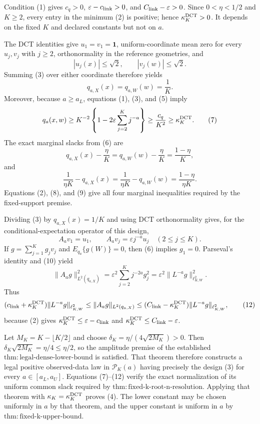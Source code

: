 Condition (1) gives \(c_q>0\), \(\varepsilon-c_{\rm link}>0\), and \(C_{\rm link}-\varepsilon>0\). Since \(0<\eta<1/2\) and \(K\ge2\), every entry in the minimum (2) is positive; hence \(\kappa_K^{\rm DCT}>0\). It depends on the fixed \(K\) and declared constants but not on \(a\).

The DCT identities give \(u_1=v_1=\mathbf1\), uniform-coordinate mean zero for every \(u_j,v_j\) with \(j\ge2\), orthonormality in the reference geometries, and
\[
|u_j(x)|\le\sqrt2,
\qquad
|v_j(w)|\le\sqrt2.
\tag{5}
\]
Summing (3) over either coordinate therefore yields
\[
q_{a,X}(x)=q_{a,W}(w)=\frac1K.
\tag{6}
\]
Moreover, because \(a\ge a_L\), equations (1), (3), and (5) imply
\[
q_a(x,w)
\ge K^{-2}\left\{1-2\varepsilon\sum_{j=2}^Kj^{-a}\right\}
\ge\frac{c_q}{K^2}
\ge\kappa_K^{\rm DCT}.
\tag{7}
\]
The exact marginal slacks from (6) are
\[
q_{a,X}(x)-\frac\eta K
=q_{a,W}(w)-\frac\eta K
=\frac{1-\eta}{K},
\tag{8}
\]
and
\[
\frac1{\eta K}-q_{a,X}(x)
=\frac1{\eta K}-q_{a,W}(w)
=\frac{1-\eta}{\eta K}.
\tag{9}
\]
Equations (2), (8), and (9) give all four marginal inequalities required by the fixed-support premise.

Dividing (3) by \(q_{a,X}(x)=1/K\) and using DCT orthonormality gives, for the conditional-expectation operator of this design,
\[
A_av_1=u_1,
\qquad
A_av_j=\varepsilon j^{-a}u_j
\quad(2\le j\le K).
\tag{10}
\]
If \(g=\sum_{j=1}^Kg_jv_j\) and \(E_{q_a}\{g(W)\}=0\), then (6) implies \(g_1=0\). Parseval's identity and (10) yield
\[
\|A_ag\|_{L^2(q_{a,X})}^2
=\varepsilon^2\sum_{j=2}^Kj^{-2a}g_j^2
=\varepsilon^2\|L^{-a}g\|_{\ell^2_{K,W}}^2.
\tag{11}
\]
Thus
\[
(c_{\rm link}+\kappa_K^{\rm DCT})\|L^{-a}g\|_{\ell^2_{K,W}}
\le\|A_ag\|_{L^2(q_{a,X})}
\le(C_{\rm link}-\kappa_K^{\rm DCT})\|L^{-a}g\|_{\ell^2_{K,W}},
\tag{12}
\]
because (2) gives \(\kappa_K^{\rm DCT}\le\varepsilon-c_{\rm link}\) and \(\kappa_K^{\rm DCT}\le C_{\rm link}-\varepsilon\).

Let \(M_K=K-\lfloor K/2\rfloor\) and choose \(\delta_K=\eta/(4\sqrt{2M_K})>0\). Then \(\delta_K\sqrt{2M_K}=\eta/4\le\eta/2\), so the amplitude premise of the established \(\mathrm{thm:legal\mbox{-}dense\mbox{-}lower\mbox{-}bound}\) is satisfied. That theorem therefore constructs a legal positive observed-data law in \(\mathcal P_K(a)\) having precisely the design (3) for every \(a\in[a_L,a_U]\). Equations (7)--(12) verify the exact normalization of its uniform common slack required by \(\mathrm{thm:fixed\mbox{-}k\mbox{-}root\mbox{-}n\mbox{-}resolution}\). Applying that theorem with \(\kappa_K=\kappa_K^{\rm DCT}\) proves (4). The lower constant may be chosen uniformly in \(a\) by that theorem, and the upper constant is uniform in \(a\) by \(\mathrm{thm:fixed\mbox{-}k\mbox{-}upper\mbox{-}bound}\).

